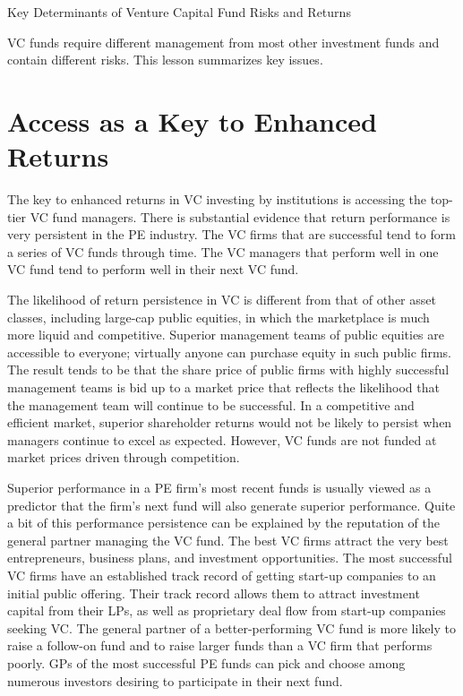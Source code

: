 \documentclass[11pt]{article}
\begin{document}
Key Determinants of Venture Capital Fund Risks and Returns

VC funds require different management from most other investment funds and contain different risks. This lesson summarizes key issues.

\section*{Access as a Key to Enhanced Returns}
The key to enhanced returns in VC investing by institutions is accessing the top-tier VC fund managers. There is substantial evidence that return performance is very persistent in the PE industry. The VC firms that are successful tend to form a series of VC funds through time. The VC managers that perform well in one VC fund tend to perform well in their next VC fund.

The likelihood of return persistence in VC is different from that of other asset classes, including large-cap public equities, in which the marketplace is much more liquid and competitive. Superior management teams of public equities are accessible to everyone; virtually anyone can purchase equity in such public firms. The result tends to be that the share price of public firms with highly successful management teams is bid up to a market price that reflects the likelihood that the management team will continue to be successful. In a competitive and efficient market, superior shareholder returns would not be likely to persist when managers continue to excel as expected. However, VC funds are not funded at market prices driven through competition.

Superior performance in a PE firm's most recent funds is usually viewed as a predictor that the firm's next fund will also generate superior performance. Quite a bit of this performance persistence can be explained by the reputation of the general partner managing the VC fund. The best VC firms attract the very best entrepreneurs, business plans, and investment opportunities. The most successful VC firms have an established track record of getting start-up companies to an initial public offering. Their track record allows them to attract investment capital from their LPs, as well as proprietary deal flow from start-up companies seeking VC. The general partner of a better-performing VC fund is more likely to raise a follow-on fund and to raise larger funds than a VC firm that performs poorly. GPs of the most successful PE funds can pick and choose among numerous investors desiring to participate in their next fund.
\end{document}

